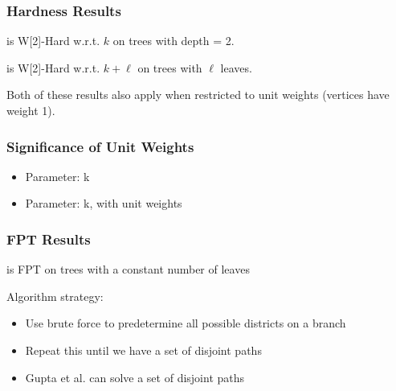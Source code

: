 \begin{frame}
    \frametitle{Hardness Results}
    \begin{theorem}
        \gm is W[2]-Hard w.r.t. $k$ on trees with depth = 2.
    \end{theorem}
    
    \vspace{1.0cm}
     {
    \begin{theorem}
        \gm is W[2]-Hard w.r.t. $k+\ell$ on trees with $\ell$ leaves.
    \end{theorem}
    }
    
    \vspace{1.0cm}
     {
        Both of these results also apply when restricted to unit weights (vertices have weight 1).
    }
    
\end{frame}

\begin{frame}
    \frametitle{Significance of Unit Weights}
    \begin{itemize}
        \item Parameter: k
    \end{itemize}
	

    \begin{itemize}
        \item Parameter: k, with unit weights
    \end{itemize}
    
\end{frame}

\begin{frame}
    \frametitle{FPT Results}
    \begin{theorem}
        \gm is FPT on trees with a constant number of leaves
    \end{theorem}
    
    \vspace{1.0cm}
     {
        Algorithm strategy:
        \begin{itemize}
            \item Use brute force to predetermine all possible districts on a branch
            \item Repeat this until we have a set of disjoint paths
            \item Gupta et al. can solve a set of disjoint paths
        \end{itemize}
    }
\end{frame}


